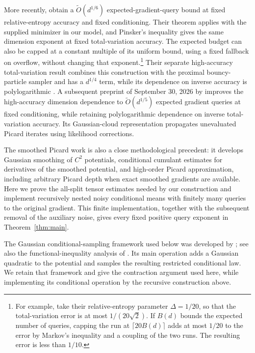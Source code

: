 More recently, \citet[Theorem~7.1(i)]{chen2026picard} obtain
a \(\widetilde O(d^{1/6})\) expected-gradient-query bound at fixed
relative-entropy accuracy and fixed conditioning. Their theorem applies
with the supplied minimizer in our model, and Pinsker's inequality gives
the same dimension exponent at fixed total-variation accuracy.
The expected budget can also be capped at a constant multiple of its
uniform bound, using a fixed fallback on overflow, without changing that
exponent.\footnote{For example, take their relative-entropy parameter
\(\Delta=1/20\), so that the total-variation error is at most
\(1/(20\sqrt2)\). If \(B(d)\) bounds the expected number of queries,
capping the run at \(\lceil20B(d)\rceil\) adds at most \(1/20\) to
the error by Markov's inequality and a coupling of the two runs.
The resulting error is less than \(1/10\).}
Their separate high-accuracy total-variation result combines this
construction with the proximal bouncy-particle sampler
\citep{chen2026bps} and has a \(d^{1/4}\) term, while its dependence
on inverse accuracy is polylogarithmic
\citep[Theorem~1.3]{chen2026picard}.
A subsequent preprint of September 30, 2026 by
\citet[Theorem~1.1]{chen2026cloud} improves the high-accuracy
dimension dependence to \(\widetilde O(d^{1/5})\) expected gradient
queries at fixed conditioning, while retaining polylogarithmic dependence
on inverse total-variation accuracy. Its Gaussian-cloud representation
propagates unevaluated Picard iterates using likelihood corrections.

The smoothed Picard work is also a close methodological precedent:
it develops Gaussian smoothing of \(C^2\) potentials, conditional
cumulant estimates for derivatives of the smoothed potential, and
high-order Picard approximation, including
arbitrary Picard depth when exact smoothed gradients are available.
Here we prove the all-split tensor estimates needed by our construction
and implement recursively nested noisy conditional means with finitely
many queries to the original gradient. This finite implementation,
together with the subsequent removal of the auxiliary noise, gives
every fixed positive query exponent in Theorem~\ref{thm:main}.

The Gaussian conditional-sampling framework used below was developed by
\citet{lee2021proximal}; see also the functional-inequality analysis of
\citet{chen2022proximal}. Its main operation adds a Gaussian quadratic
to the potential and samples the resulting restricted conditional law.
We retain that framework and give the contraction argument used here,
while implementing its conditional operation by the recursive
construction above.

